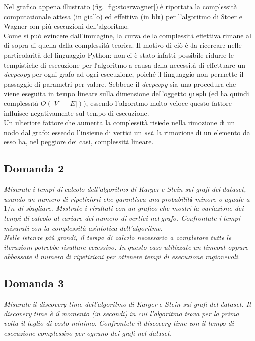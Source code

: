 Nel grafico appena illustrato (fig. \ref{fig:stoerwagner}) è riportata la complessità computazionale attesa (in giallo) ed effettiva (in blu) per l'algoritmo di Stoer e Wagner con più esecuzioni dell'algoritmo. \\
Come si può evincere dall'immagine, la curva della complessità effettiva rimane al di sopra di quella della complessità teorica. Il motivo di ciò è da ricercare nelle particolarità del linguaggio Python: non ci è stato infatti possibile ridurre le tempistiche di esecuzione per l'algoritmo a causa della necessità di effettuare un \textit{deepcopy} per ogni grafo ad ogni esecuzione, poiché il linguaggio non permette il passaggio di parametri per valore. Sebbene il \textit{deepcopy} sia una procedura che viene eseguita in tempo lineare sulla dimensione dell'oggetto \texttt{graph} (ed ha quindi complessità $O(|V|+|E|)$), essendo l'algoritmo molto veloce questo fattore influisce negativamente sul tempo di esecuzione. \\
Un ulteriore fattore che aumenta la complessità risiede nella rimozione di un nodo dal grafo: essendo l'insieme di vertici un \textit{set}, la rimozione di un elemento da esso ha, nel peggiore dei casi, complessità lineare.

\subsection{Domanda 2}
\textit{Misurate i tempi di calcolo dell'algoritmo di Karger e Stein sui grafi del dataset, usando un numero di ripetizioni che garantisca una probabilità minore o uguale a $1/n$ di sbagliare. Mostrate i risultati con un grafico che mostri la variazione dei tempi di calcolo al variare del numero di vertici nel grafo. Confrontate i tempi misurati con la complessità asintotica dell'algoritmo. \\
Nelle istanze più grandi, il tempo di calcolo necessario a completare tutte le iterazioni potrebbe risultare eccessivo. In questo caso utilizzate un timeout oppure abbassate il numero di ripetizioni per ottenere tempi di esecuzione ragionevoli.}


\subsection{Domanda 3}
\textit{Misurate il discovery time dell'algoritmo di Karger e Stein sui grafi del dataset. Il discovery time è il momento (in secondi) in cui l'algoritmo trova per la prima volta il taglio di costo minimo.  Confrontate il discovery time con il tempo di esecuzione complessivo per ognuno dei grafi nel dataset.}

